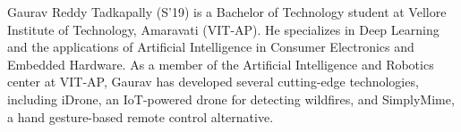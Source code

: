 \documentclass[journal,12pt,onecolumn,letterpaper]{IEEEtran}
\begin{document}
\begin{IEEEbiography}
{Gaurav Reddy Tadkapally} (S'19) is a Bachelor of Technology student at Vellore Institute of Technology, Amaravati (VIT-AP). He specializes in Deep Learning and the applications of Artificial Intelligence in Consumer Electronics and Embedded Hardware. As a member of the Artificial Intelligence and Robotics center at VIT-AP, Gaurav has developed several cutting-edge technologies, including iDrone, an IoT-powered drone for detecting wildfires, and SimplyMime, a hand gesture-based remote control alternative.
\end{IEEEbiography}


\begin{IEEEbiography}

\end{IEEEbiography}
\end{document}
